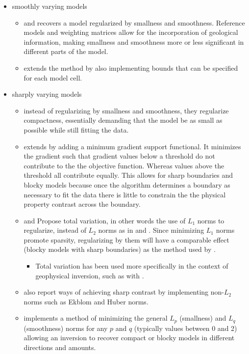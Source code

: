 \begin{itemize}
\item smoothly varying models
\begin{itemize}
\item \cite{li19963} and \cite{li19983}recovers a model regularized by smallness and smoothness. Reference models and weighting matrices allow for the incorporation of geological information, making smallness and smoothness more or less significant in different parts of the model.

\item \cite{li2003fast}  extends the method by also implementing bounds that can be specified for each model cell.
\end{itemize}
\item sharply varying models	
\begin{itemize}	
\item \cite{last1983compact} instead of regularizing by smallness and smoothness, they regularize compactness, essentially demanding that the model be as small as possible while still fitting the data. 	
\item \cite{portniaguine1999focusing} extends  \cite{last1983compact} by adding a minimum gradient support functional. It minimizes the gradient such that gradient values below a threshold do not contribute to the the objective function. Whereas values above the threshold all contribute equally. This allows for sharp boundaries and blocky models because once the algorithm determines a boundary as necessary to fit the data there is little to constrain the the physical property contrast across the boundary.
\item \cite{rudin1992nonlinear} and \cite{vogel1998fast} Propose total variation, in other words the use of $L_1$ norms to regularize, instead of $L_2$ norms as in \cite{li19963} and \cite{li19983}. Since minimizing $L_1$ norms promote sparsity, regularizing by them will have a comparable effect (blocky models with sharp boundaries) as the method used by \cite{portniaguine1999focusing}.
	\begin{itemize}
		\item Total variation has been used more specifically in the context of geophysical inversion, such as with \cite{guitton2012blocky}.	
	\end{itemize}
\item \cite{farquharson1998non} also report ways of achieving sharp contrast by implementing non-$L_2$ norms such as Ekblom and Huber norms.
\item \cite{fournier2015cooperative} implements a method of minimizing the general $L_p$ (smallness) and $L_q$ (smoothness) norms for any $p$ and $q$ (typically values between 0 and 2) allowing an inversion to recover compact or blocky models in different directions and amounts.

\end{itemize}
\end{itemize}
